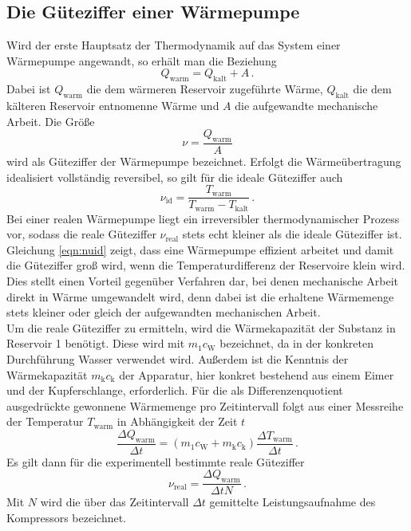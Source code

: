 \subsection{Die Güteziffer einer Wärmepumpe}
Wird der erste Hauptsatz der Thermodynamik auf das System einer Wärmepumpe angewandt,
so erhält man die Beziehung
\begin{equation}
  Q_\text{warm} = Q_\text{kalt} + A\,.
  \label{eqn:waermebilanz}
\end{equation}
Dabei ist $Q_\text{warm}$ die dem wärmeren Reservoir zugeführte Wärme,
$Q_\text{kalt}$ die dem kälteren Reservoir entnomenne Wärme und $A$ die aufgewandte
mechanische Arbeit.
Die Größe
\begin{equation}
  \nu = \frac{Q_\text{warm}}{A}
  \label{eqn:defnu}
\end{equation}
wird als Güteziffer der Wärmepumpe bezeichnet.
Erfolgt die Wärmeübertragung idealisiert vollständig reversibel, so gilt für die ideale
Güteziffer auch
\begin{equation}
  \nu_\text{id} = \frac{T_\text{warm}}{T_\text{warm} - T_\text{kalt}}\,.
  \label{eqn:nuid}
\end{equation}
Bei einer realen Wärmepumpe liegt ein irreversibler thermodynamischer Prozess vor,
sodass die reale Güteziffer $\nu_\text{real}$ stets echt kleiner als die ideale
Güteziffer ist.
Gleichung \eqref{eqn:nuid} zeigt, dass eine Wärmepumpe effizient arbeitet und damit
die Güteziffer groß wird, wenn die Temperaturdifferenz der Reservoire
klein wird. Dies stellt einen Vorteil gegenüber Verfahren dar, bei denen mechanische Arbeit
direkt in Wärme umgewandelt wird, denn dabei ist die erhaltene Wärmemenge stets kleiner
oder gleich der aufgewandten mechanischen Arbeit.\\
Um die reale Güteziffer zu ermitteln, wird die Wärmekapazität der Substanz
in Reservoir 1 benötigt. Diese wird mit $m_1 c_\text{W}$ bezeichnet, da in der konkreten Durchführung
Wasser verwendet wird. Außerdem ist die Kenntnis der Wärmekapazität $m_\text{k} c_\text{k}$
der Apparatur, hier konkret bestehend aus einem Eimer und der Kupferschlange, erforderlich.
Für die als Differenzenquotient ausgedrückte gewonnene Wärmemenge pro Zeitintervall
folgt aus einer Messreihe der Temperatur $T_\text{warm}$ in Abhängigkeit der Zeit $t$
\begin{equation}
  \frac{\Delta Q_\text{warm}}{\Delta t} = (m_1 c_\text{W} + m_\text{k} c_\text{k}) \frac{\Delta T_\text{warm}}{\Delta t}\,.
  \label{eqn:waermewarmprozeit}
\end{equation}
Es gilt dann für die experimentell bestimmte reale Güteziffer
\begin{equation}
  \nu_\text{real} = \frac{\Delta Q_\text{warm}}{\Delta t N}\,.
  \label{eqn:nureal}
\end{equation}
Mit $N$ wird die über das Zeitintervall $\Delta t$ gemittelte Leistungsaufnahme des
Kompressors bezeichnet.
